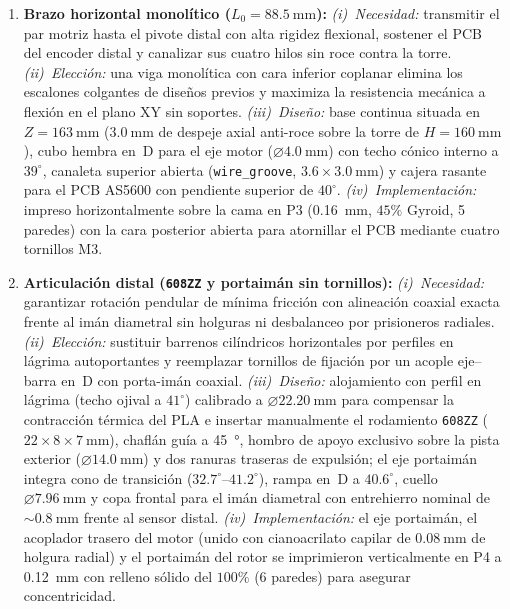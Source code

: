 \begin{enumerate}
    \item \textbf{Brazo horizontal monolítico ($L_0=\qty{88.5}{\milli\meter}$):}
    \textit{(i)~Necesidad:} transmitir el par motriz hasta el pivote distal con alta rigidez flexional, sostener el PCB del encoder distal y canalizar sus cuatro hilos sin roce contra la torre.
    \textit{(ii)~Elección:} una viga monolítica con cara inferior coplanar elimina los escalones colgantes de diseños previos y maximiza la resistencia mecánica a flexión en el plano XY sin soportes.
    \textit{(iii)~Diseño:} base continua situada en $Z=\qty{163}{\milli\meter}$ ($\qty{3.0}{\milli\meter}$ de despeje axial anti-roce sobre la torre de $H=\qty{160}{\milli\meter}$), cubo hembra en~D para el eje motor ($\varnothing\qty{4.0}{\milli\meter}$) con techo cónico interno a $39^\circ$, canaleta superior abierta (\texttt{wire\_groove}, $3.6\times\qty{3.0}{\milli\meter}$) y cajera rasante para el PCB AS5600 con pendiente superior de $40^\circ$.
    \textit{(iv)~Implementación:} impreso horizontalmente sobre la cama en P3 (\qty{0.16}{\milli\meter}, $45\%$ Gyroid, 5 paredes) con la cara posterior abierta para atornillar el PCB mediante cuatro tornillos M3.

    \item \textbf{Articulación distal (\texttt{608ZZ} y portaimán sin tornillos):}
    \textit{(i)~Necesidad:} garantizar rotación pendular de mínima fricción con alineación coaxial exacta frente al imán diametral sin holguras ni desbalanceo por prisioneros radiales.
    \textit{(ii)~Elección:} sustituir barrenos cilíndricos horizontales por perfiles en lágrima autoportantes y reemplazar tornillos de fijación por un acople eje--barra en~D con porta-imán coaxial.
    \textit{(iii)~Diseño:} alojamiento con perfil en lágrima (techo ojival a $41^\circ$) calibrado a $\varnothing\qty{22.20}{\milli\meter}$ para compensar la contracción térmica del PLA e insertar manualmente el rodamiento \texttt{608ZZ} ($22\times 8\times\qty{7}{\milli\meter}$), chaflán guía a \qty{45}{\degree}, hombro de apoyo exclusivo sobre la pista exterior ($\varnothing\qty{14.0}{\milli\meter}$) y dos ranuras traseras de expulsión; el eje portaimán integra cono de transición ($32.7^\circ\text{--}41.2^\circ$), rampa en~D a $40.6^\circ$, cuello $\varnothing\qty{7.96}{\milli\meter}$ y copa frontal para el imán diametral con entrehierro nominal de $\sim\qty{0.8}{\milli\meter}$ frente al sensor distal.
    \textit{(iv)~Implementación:} el eje portaimán, el acoplador trasero del motor (unido con cianoacrilato capilar de $\qty{0.08}{\milli\meter}$ de holgura radial) y el portaimán del rotor se imprimieron verticalmente en P4 a \qty{0.12}{\milli\meter} con relleno sólido del $100\%$ (6 paredes) para asegurar concentricidad.


\end{enumerate}
